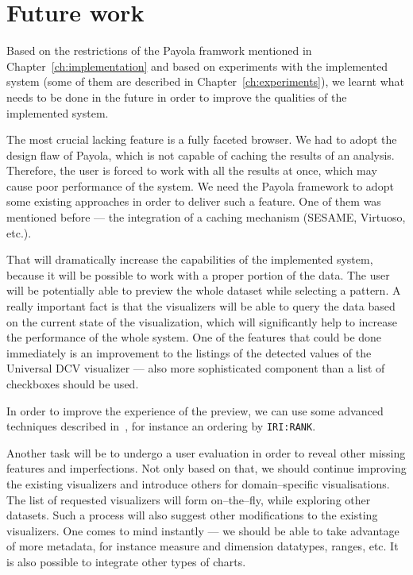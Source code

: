 \chapter{Future work}
\label{ch:future}

Based on the restrictions of the Payola framwork mentioned in Chapter~\ref{ch:implementation}
and based on experiments with the implemented system (some of them are described in
Chapter~\ref{ch:experiments}), we learnt what needs to be done in the future in order to improve
the qualities of the implemented system.

The most crucial lacking feature is a fully faceted browser. We had to adopt the 
design flaw of Payola, which is not capable of caching the results of an analysis. 
Therefore, the user is forced to work with all the results at once, which may 
cause poor performance of the system. We need the Payola framework to adopt some 
existing approaches in order to deliver such a feature. One of them was 
mentioned before --- the integration of a caching mechanism (SESAME, Virtuoso, etc.).

That will dramatically increase the capabilities of the implemented system, 
because it will be possible to work with a proper portion of the data. The user will 
be potentially able to preview the whole dataset while selecting a pattern. A 
really important fact is that the visualizers will be able to query the data 
based on the current state of the visualization, which will significantly help 
to increase the performance of the whole system. One of the features that could 
be done immediately is an improvement to the listings of the detected values of the 
Universal DCV visualizer --- also more sophisticated component than a list of 
checkboxes should be used.

In order to improve the experience of the preview, we can use some advanced 
techniques described in~\cite{faceted-ldow2009}, for instance an ordering by 
\texttt{IRI:RANK}.

Another task will be to undergo a user evaluation in order to reveal other 
missing features and imperfections. Not only based on that, we should continue 
improving the existing visualizers and introduce others for
domain--specific visualisations. The list of requested visualizers will form 
on--the--fly, while exploring other datasets. Such a process will also suggest 
other modifications to the existing visualizers. One comes to mind instantly --- we 
should be able to take advantage of more metadata, for instance measure and 
dimension datatypes, ranges, etc. It is also possible to integrate other types 
of charts.

